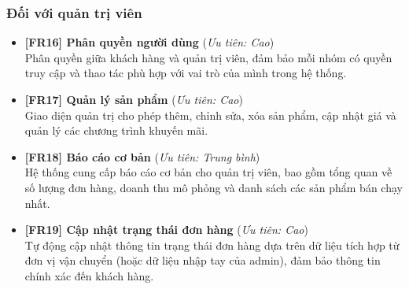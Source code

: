 \subsubsection{Đối với quản trị viên}

\begin{itemize}
    \item \textbf{[FR16] Phân quyền người dùng} \hfill (\textit{Ưu tiên: Cao})\\
    Phân quyền giữa khách hàng và quản trị viên, đảm bảo mỗi nhóm có quyền truy cập và thao tác phù hợp với vai trò của mình trong hệ thống.

\item \textbf{[FR17] Quản lý sản phẩm} \hfill (\textit{Ưu tiên: Cao})\\
    Giao diện quản trị cho phép thêm, chỉnh sửa, xóa sản phẩm, cập nhật giá và quản lý các chương trình khuyến mãi.

\item \textbf{[FR18] Báo cáo cơ bản} \hfill (\textit{Ưu tiên: Trung bình})\\
    Hệ thống cung cấp báo cáo cơ bản cho quản trị viên, bao gồm tổng quan về số lượng đơn hàng, doanh thu mô phỏng và danh sách các sản phẩm bán chạy nhất.

\item \textbf{[FR19] Cập nhật trạng thái đơn hàng} \hfill (\textit{Ưu tiên: Cao})\\
    Tự động cập nhật thông tin trạng thái đơn hàng dựa trên dữ liệu tích hợp từ đơn vị vận chuyển (hoặc dữ liệu nhập tay của admin), đảm bảo thông tin chính xác đến khách hàng.
    
\end{itemize}
